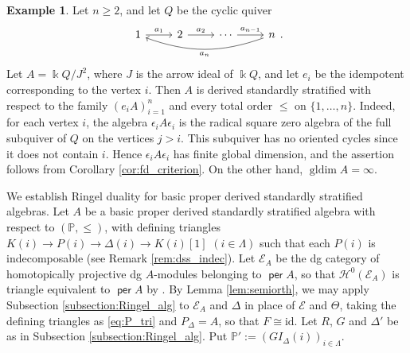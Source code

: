 \documentclass[a4paper,reqno,11pt]{amsart}
\numberwithin{equation}{section}
\theoremstyle{definition}
\newtheorem{example}[theorem]{Example}
\newcommand{\E}{\mathcal{E}}
\renewcommand{\H}{\mathcal{H}}
\newcommand{\PP}{\mathbb{P}}
\newcommand{\e}{\epsilon}
\newcommand{\bte}{\Theta}
\newcommand{\bde}{\Delta}
\newcommand{\kk}{\Bbbk}
\newcommand{\id}{\mathrm{id}}
\DeclareMathOperator{\gldim}{gldim}
\DeclareMathOperator{\per}{\mathsf{per}}
\begin{document}
\begin{example}
Let $n\geq 2$, and let $Q$ be the cyclic quiver
\[
\begin{tikzcd}
1 \arrow[r, "a_{1}"] & 2 \arrow[r, "a_{2}"] & \cdots \arrow[r, "a_{n-1}"] & n \arrow[lll, bend left=20, "a_{n}"]
\end{tikzcd}.
\]
Let $A=\kk Q/J^{2}$, where $J$ is the arrow ideal of $\kk Q$, and let $e_{i}$ be the idempotent corresponding to the vertex $i$.
Then $A$ is derived standardly stratified with respect to the family $(e_{i}A)_{i=1}^{n}$ and every total order $\leq$ on $\{1,\ldots,n\}$.
Indeed, for each vertex $i$, the algebra $\e_{i}A\e_{i}$ is the radical square zero algebra of the full subquiver of $Q$ on the vertices $j>i$.
This subquiver has no oriented cycles since it does not contain $i$.
Hence $\e_{i}A\e_{i}$ has finite global dimension, and the assertion follows from Corollary \ref{cor:fd_criterion}.
On the other hand, $\gldim A=\infty$.
\end{example}

We establish Ringel duality for basic proper derived standardly stratified algebras.
Let $A$ be a basic proper derived standardly stratified algebra with respect to $(\PP,\leq)$, with defining triangles $K(i)\to P(i)\to\bde(i)\to K(i)[1]$ $(i\in\Lambda)$ such that each $P(i)$ is indecomposable (see Remark \ref{rem:dss_indec}).
Let $\E_{A}$ be the dg category of homotopically projective dg $A$-modules belonging to $\per A$, so that $\H^{0}(\E_{A})$ is triangle equivalent to $\per A$ by \cite[4.1]{K94}.
By Lemma \ref{lem:semiorth}, we may apply Subsection \ref{subsection:Ringel_alg} to $\E_{A}$ and $\bde$ in place of $\E$ and $\bte$, taking the defining triangles as \eqref{eq:P_tri} and $P_{\bde}=A$, so that $F\cong\id$.
Let $R$, $G$ and $\bde'$ be as in Subsection \ref{subsection:Ringel_alg}.
Put $\PP':=(GI_{\bde}(i))_{i\in\Lambda}$.
\end{document}
